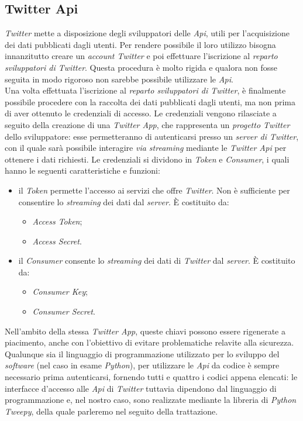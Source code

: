 \subsection{Twitter Api}
\textit{Twitter} mette a disposizione degli sviluppatori delle \textit{Api}, utili per l'acquisizione dei dati pubblicati dagli utenti. Per rendere possibile il loro utilizzo bisogna innanzitutto creare un \textit{account Twitter} e poi effettuare l'iscrizione al \textit{reparto sviluppatori di Twitter}. Questa procedura è molto rigida e qualora non fosse seguita in modo rigoroso non sarebbe possibile utilizzare le \textit{Api}. 
\\Una volta effettuata l'iscrizione al \textit{reparto sviluppatori di Twitter}, è finalmente possibile procedere con la raccolta dei dati pubblicati dagli utenti, ma non prima di aver ottenuto le credenziali di accesso. Le credenziali vengono rilasciate a seguito della creazione di una \textit{Twitter App}, che rappresenta un \textit{progetto Twitter} dello sviluppatore: esse permetteranno di autenticarsi presso un \textit{server di Twitter}, con il quale sarà possibile interagire \textit{via streaming} mediante le \textit{Twitter Api} per ottenere i dati richiesti. Le credenziali si dividono in \textit{Token} e \textit{Consumer}, i quali hanno le seguenti caratteristiche e funzioni:
\begin{itemize}
\item il \textit{Token} permette l'accesso ai servizi che offre \textit{Twitter}. Non è sufficiente per consentire lo \textit{streaming} dei dati dal \textit{server}. \`E costituito da:
\begin{itemize}
\item \textit{Access Token};
\item \textit{Access Secret}.
\end{itemize}
\item il \textit{Consumer} consente lo \textit{streaming} dei dati di \textit{Twitter} dal \textit{server}. \`E costituito da:
\begin{itemize}
\item \textit{Consumer Key};
\item \textit{Consumer Secret}.
\end{itemize}
\end{itemize}
Nell'ambito della stessa \textit{Twitter App}, queste chiavi possono essere rigenerate a piacimento, anche con l'obiettivo di evitare problematiche relavite alla sicurezza. Qualunque sia il linguaggio di programmazione utilizzato per lo sviluppo del \textit{software} (nel caso in esame \textit{Python}), per utilizzare le \textit{Api} da codice è sempre necessario prima autenticarsi, fornendo tutti e quattro i codici appena elencati: le interfacce d'accesso alle \textit{Api} di \textit{Twitter} tuttavia dipendono dal linguaggio di programmazione e, nel nostro caso, sono realizzate mediante la libreria di \textit{Python Tweepy}, della quale parleremo nel seguito della trattazione.
